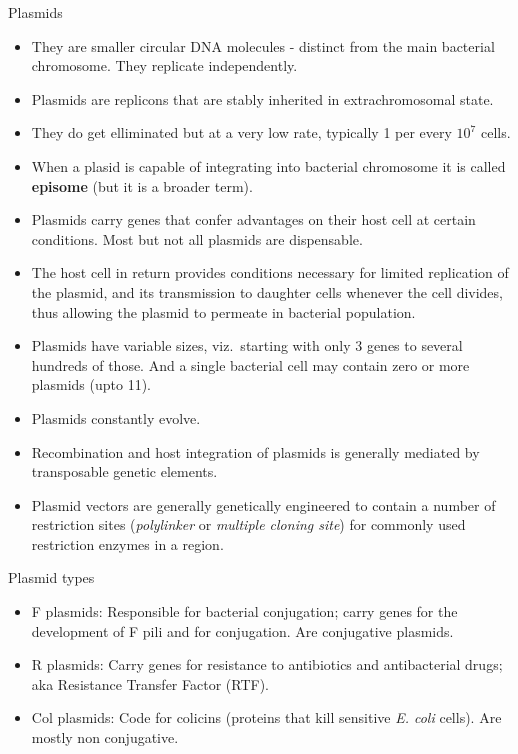 \documentclass[11pt,dvipsnames,ignorenonframetext,aspectratio=169]{beamer}
\providecommand{\tightlist}{%
  \setlength{\itemsep}{0pt}\setlength{\parskip}{0pt}}
\begin{document}
\begin{frame}{Plasmids}
\protect\hypertarget{plasmids}{}
\begin{itemize}
\tightlist
\item
  They are smaller circular DNA molecules - distinct from the main
  bacterial chromosome. They replicate independently.
\item
  Plasmids are replicons that are stably inherited in extrachromosomal
  state.
\item
  They do get elliminated but at a very low rate, typically 1 per every
  \(10^{7}\) cells.
\item
  When a plasid is capable of integrating into bacterial chromosome it
  is called \textbf{episome} (but it is a broader term).
\item
  Plasmids carry genes that confer advantages on their host cell at
  certain conditions. Most but not all plasmids are dispensable.
\item
  The host cell in return provides conditions necessary for limited
  replication of the plasmid, and its transmission to daughter cells
  whenever the cell divides, thus allowing the plasmid to permeate in
  bacterial population.
\end{itemize}
\end{frame}

\begin{frame}{}
\protect\hypertarget{section-19}{}
\begin{itemize}
\tightlist
\item
  Plasmids have variable sizes, viz.~starting with only 3 genes to
  several hundreds of those. And a single bacterial cell may contain
  zero or more plasmids (upto 11).
\item
  Plasmids constantly evolve.
\item
  Recombination and host integration of plasmids is generally mediated
  by transposable genetic elements.
\item
  Plasmid vectors are generally genetically engineered to contain a
  number of restriction sites (\emph{polylinker} or \emph{multiple
  cloning site}) for commonly used restriction enzymes in a region.
\end{itemize}
\end{frame}

\begin{frame}{Plasmid types}
\protect\hypertarget{plasmid-types}{}
\begin{itemize}
\tightlist
\item
  F plasmids: Responsible for bacterial conjugation; carry genes for the
  development of F pili and for conjugation. Are conjugative plasmids.
\item
  R plasmids: Carry genes for resistance to antibiotics and
  antibacterial drugs; aka Resistance Transfer Factor (RTF).
\item
  Col plasmids: Code for colicins (proteins that kill sensitive \emph{E.
  coli} cells). Are mostly non conjugative.
\end{itemize}
\end{frame}
\end{document}
